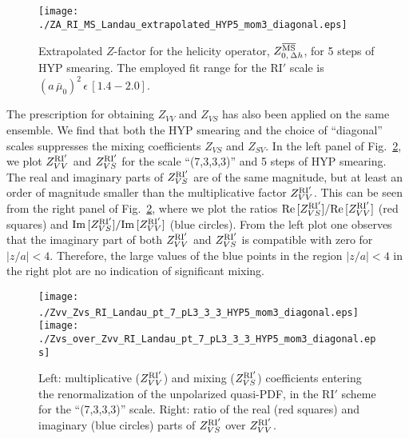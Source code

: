\documentclass[12pt,tighten,nofootinbib,amssymb,floatfix]{article}
\newcommand{\MSb}{{\overline{\rm MS}}}
\renewcommand{\Re}{{\rm Re}\,}
\renewcommand{\Im}{{\rm Im}\,}
\begin{document}
\vspace*{0.5cm}
 \begin{figure}[!h]
\centering
\texttt{[image: ./ZA\_RI\_MS\_Landau\_extrapolated\_HYP5\_mom3\_diagonal.eps]}
\vspace*{-0.3cm}
\begin{minipage}{15cm}
\hspace*{3cm}
\caption{\small{Extrapolated $Z$-factor for the helicity operator, $Z_{0, \,{\Delta h}}^{\MSb}$, for 5 steps of HYP smearing. 
The employed fit range for the RI$'$ scale is $(a\,\bar\mu_0)^2\,\epsilon\, [1.4 {-} 2.0]$.}}
\label{fig:ZA_HYP5_extrapolated} 
\end{minipage}
\end{figure}

\vspace*{0.5cm}
The prescription for obtaining $Z_{VV}$ and $Z_{VS}$ has also been applied on the same ensemble. 
We find that both the HYP smearing and the choice of ``diagonal'' scales suppresses the mixing
coefficients $Z_{VS}$ and $Z_{SV}$. In  the left panel of Fig.~\ref{fig:Zvv_Zvs}, we plot 
$Z^{\rm RI'}_{VV}$ and $Z^{\rm RI'}_{VS}$ for the scale  ``(7,3,3,3)'' and 5 steps of HYP smearing. 
The real and imaginary parts of $Z^{\rm RI'}_{VS}$ are of the same magnitude, but at 
least an order of magnitude smaller than the multiplicative factor $Z^{\rm RI'}_{VV}$. This can be
seen from the right panel of Fig.~\ref{fig:Zvv_Zvs}, where we plot the ratios 
$\Re[Z^{\rm RI'}_{VS}]/\Re[Z^{\rm RI'}_{VV}]$ (red squares) and 
$\Im[Z^{\rm RI'}_{VS}]/\Im[Z^{\rm RI'}_{VV}]$ (blue circles). From the left plot one observes that
the imaginary part of both $Z^{\rm RI'}_{VV}$ and $Z^{\rm RI'}_{VS}$ is compatible with zero for $|z/a|<4$.
Therefore, the large values of the blue points in the region $|z/a|<4$ in the right plot are no indication of significant 
mixing.
\begin{figure}[!h]
\centering
\texttt{[image: ./Zvv\_Zvs\_RI\_Landau\_pt\_7\_pL3\_3\_3\_HYP5\_mom3\_diagonal.eps]}\,\,\,
\texttt{[image: ./Zvs\_over\_Zvv\_RI\_Landau\_pt\_7\_pL3\_3\_3\_HYP5\_mom3\_diagonal.eps]}
\vspace*{-0.3cm}
\begin{minipage}{15cm}
\hspace*{3cm}
\caption{\small{Left: multiplicative ($Z^{\rm RI'}_{VV}$) and mixing  ($Z^{\rm RI'}_{VS}$) coefficients entering
the renormalization of the unpolarized quasi-PDF, in the RI$'$ scheme for the ``(7,3,3,3)'' scale. Right: 
ratio of the real (red squares) and imaginary (blue circles) parts of $Z^{\rm RI'}_{VS}$ over $Z^{\rm RI'}_{VV}$.}}
\label{fig:Zvv_Zvs} 
\end{minipage}
\end{figure}
\end{document}
